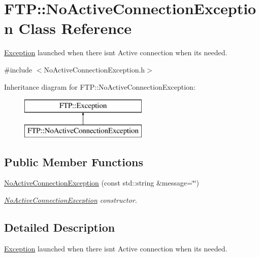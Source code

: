 \hypertarget{classFTP_1_1NoActiveConnectionException}{}\section{F\+T\+P\+:\+:No\+Active\+Connection\+Exception Class Reference}
\label{classFTP_1_1NoActiveConnectionException}


\hyperlink{classFTP_1_1Exception}{Exception} launched when there isn\textquotesingle{}t Active connection when it\textquotesingle{}s needed.  




{\ttfamily \#include $<$No\+Active\+Connection\+Exception.\+h$>$}

Inheritance diagram for F\+T\+P\+:\+:No\+Active\+Connection\+Exception\+:\begin{figure}[H]
\begin{center}
\leavevmode
\includegraphics[height=2.000000cm]{classFTP_1_1NoActiveConnectionException}
\end{center}
\end{figure}
\subsection*{Public Member Functions}
\begin{DoxyCompactItemize}
\item 
\hyperlink{classFTP_1_1NoActiveConnectionException_a8ca3caac1e8edfb7b08134935f9b8688}{No\+Active\+Connection\+Exception} (const std\+::string \&message=\char`\"{}\char`\"{})
\begin{DoxyCompactList}\small\item\em \hyperlink{classFTP_1_1NoActiveConnectionException}{No\+Active\+Connection\+Exception} constructor. \end{DoxyCompactList}\end{DoxyCompactItemize}


\subsection{Detailed Description}
\hyperlink{classFTP_1_1Exception}{Exception} launched when there isn\textquotesingle{}t Active connection when it\textquotesingle{}s needed. 


